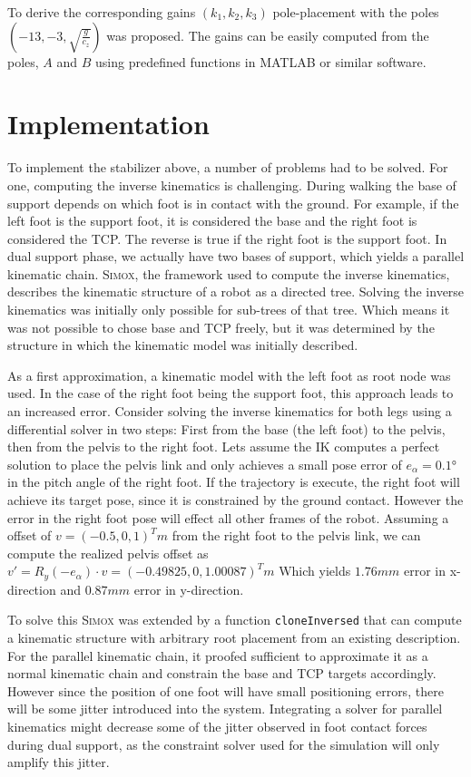 \documentclass[english,ngerman]{KITreprt}
\newcommand{\name}[1]{\textsc{#1}}
\begin{document}
To derive the corresponding gains $(k_1, k_2, k_3)$ pole-placement with
the poles $(-13, -3, \sqrt{\frac{g}{c_z}})$ was proposed. The gains can
be easily computed from the poles, $A$ and $B$ using predefined
functions in \name{MATLAB} or similar software.

\section{Implementation}\label{implementation-1}

To implement the stabilizer above, a number of problems had to be
solved. For one, computing the inverse kinematics is challenging. During
walking the base of support depends on which foot is in contact with the
ground. For example, if the left foot is the support foot, it is
considered the base and the right foot is considered the TCP. The
reverse is true if the right foot is the support foot. In dual support
phase, we actually have two bases of support, which yields a parallel
kinematic chain. \name{Simox}, the framework used to compute the inverse
kinematics, describes the kinematic structure of a robot as a directed
tree. Solving the inverse kinematics was initially only possible for
sub-trees of that tree. Which means it was not possible to chose base
and TCP freely, but it was determined by the structure in which the
kinematic model was initially described.

As a first approximation, a kinematic model with the left foot as root
node was used. In the case of the right foot being the support foot,
this approach leads to an increased error. Consider solving the inverse
kinematics for both legs using a differential solver in two steps: First
from the base (the left foot) to the pelvis, then from the pelvis to the
right foot. Lets assume the IK computes a perfect solution to place the
pelvis link and only achieves a small pose error of $e_{\alpha} = 0.1°$
in the pitch angle of the right foot. If the trajectory is execute, the
right foot will achieve its target pose, since it is constrained by the
ground contact. However the error in the right foot pose will effect all
other frames of the robot. Assuming a offset of $v = (-0.5, 0, 1)^T m$
from the right foot to the pelvis link, we can compute the realized
pelvis offset as
$v' = R_y(-e_{\alpha}) \cdot v = (-0.49825, 0,  1.00087)^T m$ Which
yields $1.76mm$ error in x-direction and $0.87mm$ error in y-direction.

To solve this \name{Simox} was extended by a function
\texttt{cloneInversed} that can compute a kinematic structure with
arbitrary root placement from an existing description. For the parallel
kinematic chain, it proofed sufficient to approximate it as a normal
kinematic chain and constrain the base and TCP targets accordingly.
However since the position of one foot will have small positioning
errors, there will be some jitter introduced into the system.
Integrating a solver for parallel kinematics might decrease some of the
jitter observed in foot contact forces during dual support, as the
constraint solver used for the simulation will only amplify this jitter.
\end{document}
